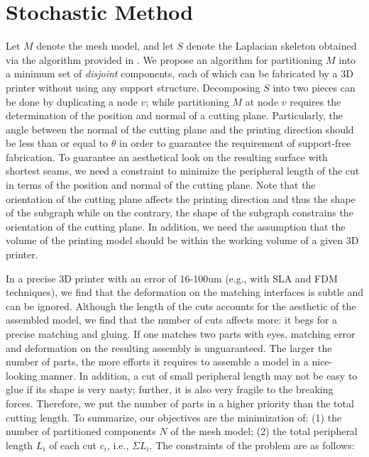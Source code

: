 \section{Stochastic Method}

Let $M$ denote the mesh model, and let $S$ denote the Laplacian skeleton obtained via the algorithm provided in \cite{AuTCCL08}. We propose an algorithm for partitioning $M$ into a minimum set of \emph{disjoint} components, each of which can be fabricated by a 3D printer without using any support structure. Decomposing $S$ into two pieces can be done by duplicating a node $v$; while partitioning $M$ at node $v$ requires the determination of the position and normal of a cutting plane. {\color{blue} Particularly, the angle between the normal of the cutting plane and the printing direction should be less than or equal to $\theta$ in order to guarantee the requirement of support-free fabrication.} To guarantee an aesthetical look on the resulting surface with shortest seams, we need a constraint to minimize the peripheral length of the cut in terms of the position and normal of the cutting plane. Note that the orientation of the cutting plane affects the printing direction and thus the shape of the subgraph while on the contrary, the shape of the subgraph constrains the orientation of the cutting plane. {In addition, we need the assumption that the volume of the printing model should be within the working volume of a given 3{D} printer.}

In a precise 3D printer with an error of 16-100um (e.g., with SLA and FDM techniques), we find that the deformation on the matching interfaces is subtle and can be ignored. Although the length of the cuts accounts for the aesthetic of the assembled model, we find that the number of cuts affects more: it begs for a precise matching and gluing. If one matches two parts with eyes, matching error and deformation on the resulting assembly is unguaranteed. The larger the number of parts, the more efforts it requires to assemble a model in a nice-looking manner. {\color{blue}In addition, a cut of small peripheral length may not be easy to glue if its shape is very nasty; further, it is also very fragile to the breaking forces.} Therefore, we put the number of parts in a higher priority than the total cutting length. To summarize, our objectives are the minimization of: (1) the number of partitioned components $N$ of the mesh model; (2) the total peripheral length $L_i$ of each cut $c_i$, i.e., $\Sigma L_i$. The constraints of the problem are as follows:

